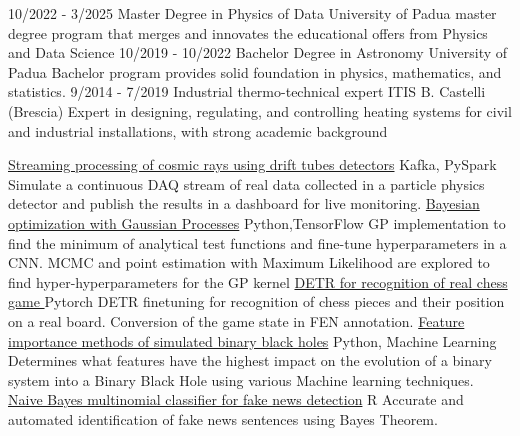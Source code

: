 \documentclass[9pt]{developercv} %
\begin{document}
\vspace{-10 pt}
\begin{entrylist}
    \entry
		{10/2022 - 3/2025}
		{Master Degree in Physics of Data }
		{University of Padua}
		{master degree program that merges and innovates the educational offers from Physics and Data Science}
    \entry
		{10/2019 - 10/2022}
		{Bachelor Degree in Astronomy}
		{University of Padua}
		{Bachelor program provides solid foundation in physics, mathematics, and statistics.}
	\entry
		{9/2014 - 7/2019}
		{Industrial thermo-technical expert}
		{ITIS B. Castelli (Brescia)}
		{Expert in designing, regulating, and controlling heating systems for civil and industrial installations, with strong academic background}
	
\end{entrylist}


\begin{entrylist}
    \entry
		{}
		{\href{https://github.com/bhroben/Streaming-processing-of-cosmic-rays-using-drift-tubes-detectors}{Streaming processing of cosmic rays using drift tubes detectors}}
		{Kafka, PySpark}
		{
         Simulate a continuous DAQ stream of real data collected in a particle physics detector and publish the results in a dashboard for live monitoring.}
    \entry
		{}
		{\href{https://github.com/bhroben/Bayesian-Optimization-with-Gaussian-Process}{Bayesian optimization with Gaussian Processes}}
		{Python,TensorFlow}
		{%
       GP implementation to find the minimum of analytical test functions and fine-tune hyperparameters in a CNN. MCMC and point estimation with Maximum Likelihood are explored to find hyper-hyperparameters for the GP kernel}
    \entry
        {}
        {\href{https://github.com/bhroben/DETR-for-recognition-of-real-chess-game}{DETR for recognition of real chess game }}
        {Pytorch}
        {%
       DETR finetuning for recognition of chess pieces and their position on a real board. Conversion of the game state in FEN annotation.}
    \entry
		{}
		{\href{https://github.com/bhroben/Feature-importance-methods-of-simulated-binary-black-holes}{Feature importance methods of simulated binary black holes}}
		{Python, Machine Learning}
		{%
        Determines what features have the highest impact on the evolution of a binary system into a Binary Black Hole using various Machine learning  techniques.}
	\entry
		{}
		{\href{https://github.com/bhroben/Naive-Bayes-multinomial-classifier-for-fake-news-detection}{Naive Bayes multinomial classifier for fake news detection}}
		{R}
		{%
        Accurate and automated identification of fake news sentences using Bayes Theorem.}

\end{entrylist}
\end{document}

